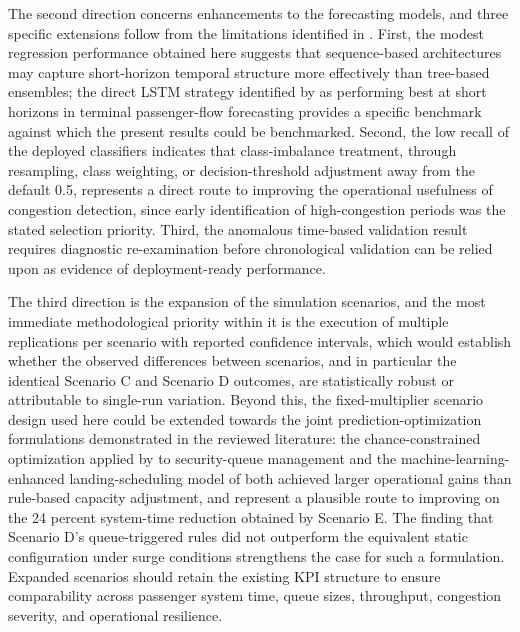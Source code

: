 The second direction concerns enhancements to the forecasting models, and three specific extensions follow from the limitations identified in . First, the modest regression performance obtained here suggests that sequence-based architectures may capture short-horizon temporal structure more effectively than tree-based ensembles; the direct LSTM strategy identified by \textcite{orsini2019neural} as performing best at short horizons in terminal passenger-flow forecasting provides a specific benchmark against which the present results could be benchmarked. Second, the low recall of the deployed classifiers indicates that class-imbalance treatment, through resampling, class weighting, or decision-threshold adjustment away from the default 0.5, represents a direct route to improving the operational usefulness of congestion detection, since early identification of high-congestion periods was the stated selection priority. Third, the anomalous time-based validation result requires diagnostic re-examination before chronological validation can be relied upon as evidence of deployment-ready performance.

The third direction is the expansion of the simulation scenarios, and the most immediate methodological priority within it is the execution of multiple replications per scenario with reported confidence intervals, which would establish whether the observed differences between scenarios, and in particular the identical Scenario C and Scenario D outcomes, are statistically robust or attributable to single-run variation. Beyond this, the fixed-multiplier scenario design used here could be extended towards the joint prediction-optimization formulations demonstrated in the reviewed literature: the chance-constrained optimization applied by \textcite{cao2025robust} to security-queue management and the machine-learning-enhanced landing-scheduling model of \textcite{pang2024machine} both achieved larger operational gains than rule-based capacity adjustment, and represent a plausible route to improving on the 24 percent system-time reduction obtained by Scenario E. The finding that Scenario D’s queue-triggered rules did not outperform the equivalent static configuration under surge conditions strengthens the case for such a formulation. Expanded scenarios should retain the existing KPI structure to ensure comparability across passenger system time, queue sizes, throughput, congestion severity, and operational resilience.

